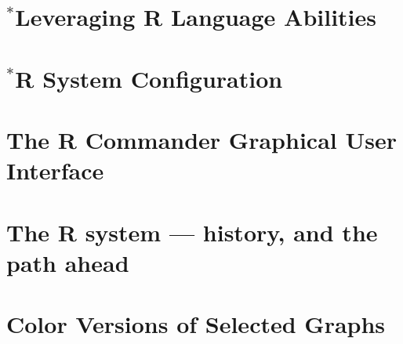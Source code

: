 \documentclass{tufte-book}\usepackage[]{graphicx}\usepackage[]{color}
\begin{document}
\chapter{$^*$Leveraging R Language Abilities }


\appendix

\chapter{$^*$R System Configuration}\label{ch:sys}


\chapter{The R Commander Graphical User Interface}


\chapter{The R system --- history, and the path ahead}\label{app:C}


\chapter{Color Versions of Selected Graphs}\label{app:D}





\renewcommand{\indexname}{Index of Functions}

\begin{fullwidth}
\printindex[fun]
\renewcommand{\indexname}{Index of Terms}
\printindex[default]
\end{fullwidth}

\end{document}
